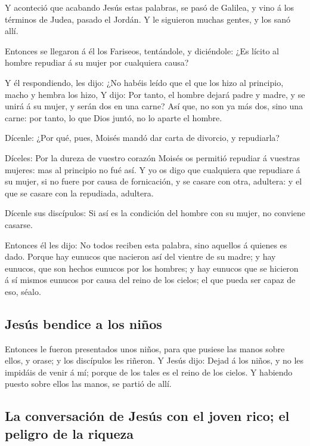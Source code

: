 Y aconteció que acabando Jesús estas palabras, se pasó de
Galilea, y vino á los términos de Judea, pasado el Jordán.
 Y le siguieron muchas gentes, y los sanó allí.

 Entonces se llegaron á él los Fariseos, tentándole, y
diciéndole: ¿Es lícito al hombre repudiar á su mujer por cualquiera
causa?

 Y él respondiendo, les dijo: ¿No habéis leído que el que
los hizo al principio, macho y hembra los hizo,  Y dijo:
Por tanto, el hombre dejará padre y madre, y se unirá á su mujer, y
serán dos en una carne?  Así que, no son ya más dos, sino
una carne: por tanto, lo que Dios juntó, no lo aparte el hombre.

 Dícenle: ¿Por qué, pues, Moisés mandó dar carta de
divorcio, y repudiarla?

 Díceles: Por la dureza de vuestro corazón Moisés os
permitió repudiar á vuestras mujeres: mas al principio no fué así.
 Y yo os digo que cualquiera que repudiare á su mujer, si
no fuere por causa de fornicación, y se casare con otra, adultera: y el
que se casare con la repudiada, adultera.

 Dícenle sus discípulos: Si así es la condición del
hombre con su mujer, no conviene casarse.

 Entonces él les dijo: No todos reciben esta palabra,
sino aquellos á quienes es dado.  Porque hay eunucos que
nacieron así del vientre de su madre; y hay eunucos, que son hechos
eunucos por los hombres; y hay eunucos que se hicieron á sí mismos
eunucos por causa del reino de los cielos; el que pueda ser capaz de
eso, séalo.

\hypertarget{jesuxfas-bendice-a-los-niuxf1os}{%
\subsection{Jesús bendice a los
niños}\label{jesuxfas-bendice-a-los-niuxf1os}}

 Entonces le fueron presentados unos niños, para que
pusiese las manos sobre ellos, y orase; y los discípulos les riñeron.
 Y Jesús dijo: Dejad á los niños, y no les impidáis de
venir á mí; porque de los tales es el reino de los cielos.
 Y habiendo puesto sobre ellos las manos, se partió de
allí.

\hypertarget{la-conversaciuxf3n-de-jesuxfas-con-el-joven-rico-el-peligro-de-la-riqueza}{%
\subsection{La conversación de Jesús con el joven rico; el peligro de la
riqueza}\label{la-conversaciuxf3n-de-jesuxfas-con-el-joven-rico-el-peligro-de-la-riqueza}}

